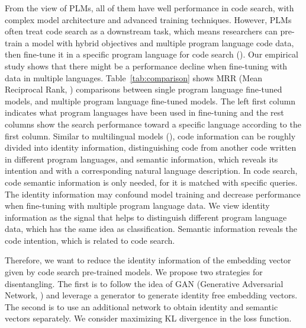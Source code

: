 From the view of PLMs, all of them have well performance in code search, with complex model architecture and advanced training techniques. However, PLMs often treat code search as a downstream task, which means researchers can pre-train a model with hybrid objectives and multiple program language code data, then fine-tune it in a specific program language for code search (\citealp{UniXcoder,CodeBERT,GraphCodeBERT,SPTCode}). Our empirical study shows that there might be a performance decline when fine-tuning with data in multiple languages. Table~\ref{tab:comparison} shows MRR (Mean Reciprocal Rank, \citealp{MRR}) comparisons between single program language fine-tuned models, and multiple program language fine-tuned models. The left first column indicates what program languages have been used in fine-tuning and the rest columns show the search performance toward a specific language according to the first column. Similar to multilingual models (\citealp{multilingualModel,YangYCD21}), code information can be roughly divided into identity information, distinguishing code from another code written in different program languages, and semantic information, which reveals its intention and with a corresponding natural language description. In code search, code semantic information is only needed, for it is matched with specific queries. The identity information may confound model training and decrease performance when fine-tuning with multiple program language data. We view identity information as the signal that helps to distinguish different program language data, which has the same idea as classification. Semantic information reveals the code intention, which is related to code search.

Therefore, we want to reduce the identity information of the embedding vector given by code search pre-trained models. We propose two strategies for disentangling.  The first is to follow the idea of GAN (Generative Adversarial Network, \citealp{goodfellow2020generative}) and leverage a generator to generate identity free embedding vectors. The second is to use an additional network to obtain identity and semantic vectors separately. We consider maximizing KL divergence in the loss function.


